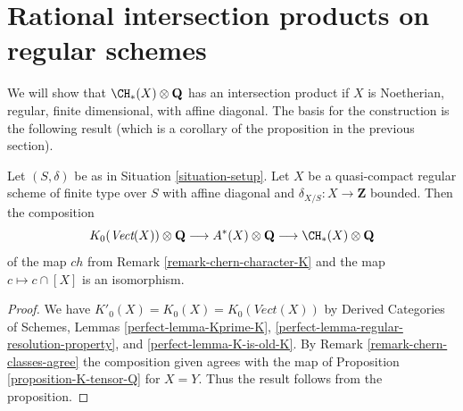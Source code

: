 \section{Rational intersection products on regular schemes}
\label{section-intersection-regular}

\noindent
We will show that $\CH_*(X) \otimes \mathbf{Q}$ has an intersection
product if $X$ is Noetherian, regular, finite dimensional, with
affine diagonal. The basis for the construction is the following result
(which is a corollary of the proposition in the previous section).

\begin{lemma}
\label{lemma-K-tensor-Q}
Let $(S, \delta)$ be as in Situation \ref{situation-setup}.
Let $X$ be a quasi-compact regular scheme of finite type over $S$ with
affine diagonal and $\delta_{X/S} : X \to \mathbf{Z}$ bounded.
Then the composition
$$
K_0(\textit{Vect}(X)) \otimes \mathbf{Q}
\longrightarrow
A^*(X) \otimes \mathbf{Q}
\longrightarrow
\CH_*(X) \otimes \mathbf{Q}
$$
of the map $ch$ from Remark \ref{remark-chern-character-K} and
the map $c \mapsto c \cap [X]$ is an isomorphism.
\end{lemma}

\begin{proof}
We have $K'_0(X) = K_0(X) = K_0(\textit{Vect}(X))$ by
Derived Categories of Schemes, Lemmas \ref{perfect-lemma-Kprime-K},
\ref{perfect-lemma-regular-resolution-property}, and
\ref{perfect-lemma-K-is-old-K}.
By Remark \ref{remark-chern-classes-agree}
the composition given agrees with the map of
Proposition \ref{proposition-K-tensor-Q} for $X = Y$.
Thus the result follows from the proposition.
\end{proof}

